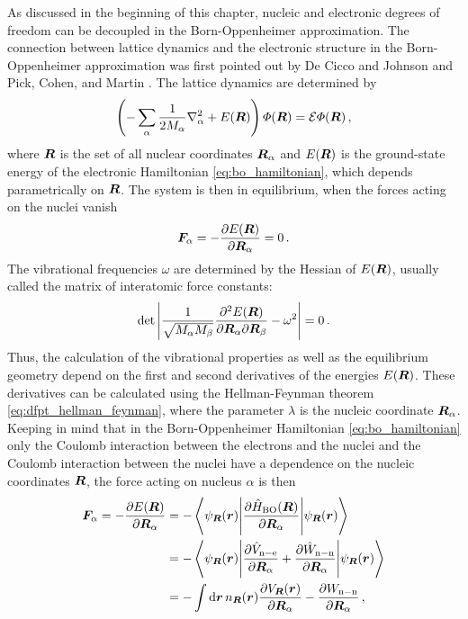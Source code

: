 \documentclass[main.tex]{subfiles}
\begin{document}
As discussed in the beginning of this chapter, nucleic and electronic degrees of freedom can be decoupled in the Born-Oppenheimer approximation.
The connection between lattice dynamics and the electronic structure in the Born-Oppenheimer approximation was first pointed out by De Cicco and Johnson  \cite{decicco_quantum_1969} and Pick, Cohen, and Martin \cite{pick_microscopic_1970}.
The lattice dynamics are determined by
\begin{equation}
    \left( - \sum_{\alpha} \frac{1}{2 M_{\alpha}} \nabla^2_{\alpha} + E(\vb*{R}) \right) \Phi (\vb*{R}) = \mathcal{E} \Phi (\vb*{R})\,,
\end{equation}
where \(\vb*{R}\) is the set of all nuclear coordinates \(\vb*{R}_{\alpha}\) and \(E(\vb*{R})\) is the ground-state energy of the electronic Hamiltonian \ref{eq:bo_hamiltonian}, which depends parametrically on \(\vb*{R}\).
The system is then in equilibrium, when the forces acting on the nuclei vanish
\begin{equation}
    \vb*{F}_{\alpha} = - \pdv{E(\vb*{R})}{\vb*{R}_{\alpha}} = 0\,.
\end{equation}
The vibrational frequencies \(\omega\) are determined by the Hessian of \(E(\vb*{R})\), usually called the matrix of interatomic force constants:
\begin{equation}
    \det \left\vert \frac{1}{\sqrt{M_{\alpha} M_{\beta}}} \pdv{E(\vb*{R})}{\vb*{R}_{\alpha}}{\vb*{R}_{\beta}} - \omega^2 \right\vert = 0\,.
\end{equation}
Thus, the calculation of the vibrational properties as well as the equilibrium geometry depend on the first and second derivatives of the energies \(E(\vb*{R})\).
These derivatives can be calculated using the Hellman-Feynman theorem \ref{eq:dfpt_hellman_feynman}, where the parameter \(\lambda\) is the nucleic coordinate \(\vb*{R}_{\alpha}\). 
Keeping in mind that in the Born-Oppenheimer Hamiltonian \ref{eq:bo_hamiltonian} only the Coulomb interaction between the electrons and the nuclei and the Coulomb interaction between the nuclei have a dependence on the nucleic coordinates \(\vb*{R}\), the force acting on nucleus \(\alpha\) is then
\begin{align}
    \vb*{F}_{\alpha} = - \pdv{E(\vb*{R})}{\vb*{R}_{\alpha}} &= - \mel**{\psi_{\vb*{R}}(\vb*{r})}{\pdv{\hat{H}_{\mathrm{BO}} (\vb*{R})}{\vb*{R}_{\alpha}}}{\psi_{\vb*{R}}(\vb*{r})} \\
    &= - \mel**{\psi_{\vb*{R}}(\vb*{r})}{\pdv{\hat{V}_{\mathrm{n-e}}}{\vb*{R}_{\alpha}} + \pdv{\hat{W}_{\mathrm{n-n}}}{\vb*{R}_{\alpha}}}{\psi_{\vb*{R}}(\vb*{r})} \\
    &= - \int \dd{\vb*{r}} n_{\vb*{R}} (\vb*{r}) \pdv{V_{\vb*{R}} (\vb*{r})}{\vb*{R}_{\alpha}} - \pdv{W_{\mathrm{n-n}}}{\vb*{R}_{\alpha}}\,,
\end{align}
\end{document}
